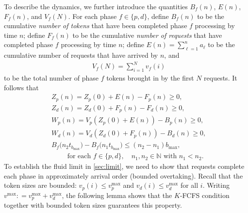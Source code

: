 \documentclass[11pt]{article}
\theoremstyle{plain}
\theoremstyle{definition}
\theoremstyle{remark}
\newcommand{\N}{\mathbb{N}}
\newcommand{\coloneqq}{\mathrel{\mathop:}=}
\begin{document}
To describe the dynamics, we further introduce the quantities
$B_f(n)$, $E(n)$, $F_f(n)$, and $V_f(N)$.  For each phase
$f\in \{p, d\}$, define $B_f(n)$ to be the cumulative \textit{number of
  tokens} that have been completed phase $f$ processing by time $n$;
define $F_f(n)$ to be the cumulative \textit{number of requests} that
have completed phase $f$ processing by time $n$; define
$E(n) = \sum_{\ell=1}^n a_\ell$ to be the cumulative number of requests that
have arrived by $n$, and 
 \begin{align}
   \label{eq:V_p}
   & V_f(N) = \sum_{i=1}^N v_f(i)
 \end{align}
 to be the total number of phase $f$ tokens brought in by the first $N$ requests. It follows that
\begin{align}
  & Z_p(n) = Z_p(0)+ E(n)-F_p(n)\ge 0,\label{eq:Z1} \\
  & Z_d(n) = Z_d(0)+ F_p(n)-F_d(n)\ge 0, \label{eq:Z2}\\
  & W_p(n)= V_p(Z_p(0)+E(n)) - B_p(n) \ge 0,\label{eq:W1} \\
  & W_d(n)= V_d(Z_d(0)+F_p(n)) - B_d(n)\ge 0,\label{eq:W2}\\
  & B_f\big(n_2 t_{b_{\max}}\big)-B_f\big(n_1t_{b_{\max}}\big) \le (n_2-n_1) b_{\max}, \nonumber \\
  & \qquad \text{ for each } f\in \{p, d\}, \quad n_1, n_2\in \N \text{ with } n_1< n_2.\label{eq:B}
\end{align}
To establish the fluid limit in \cref{sec:limit}, we need to show that requests complete each phase in approximately arrival order (bounded overtaking). Recall that the token sizes are bounded: $v_p(i)\le v_p^{\max}$ and $v_d(i)\le v_d^{\max}$ for all $i$. Writing $v^{\max}\coloneqq v_p^{\max}+v_d^{\max}$, the following lemma shows that the $K$-FCFS condition together with bounded token sizes guarantees this property.
\end{document}
